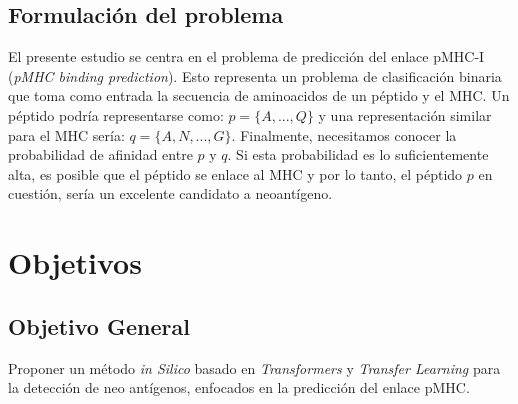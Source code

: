 \subsection{Formulación del problema}

El presente estudio se centra en el problema de predicción del enlace pMHC-I (\textit{pMHC binding prediction}). Esto representa un problema de clasificación binaria que toma como entrada la secuencia de aminoacidos de un péptido y el MHC. Un péptido podría representarse como: $p = \{A, ..., Q\}$ y una representación similar para el MHC sería: $q = \{A, N, ..., G\}$. Finalmente, necesitamos conocer la probabilidad de afinidad entre $p$ y $q$. Si esta probabilidad es lo suficientemente alta, es posible que el péptido se enlace al MHC y por lo tanto, el péptido $p$ en cuestión, sería un excelente candidato a neoantígeno.





\section{Objetivos}
\label{sec:objetivos}

\subsection{Objetivo General}


Proponer un método \textit{in Silico} basado en \textit{Transformers} y \textit{Transfer Learning} para la detección de neo antígenos, enfocados en la predicción del enlace pMHC. 

